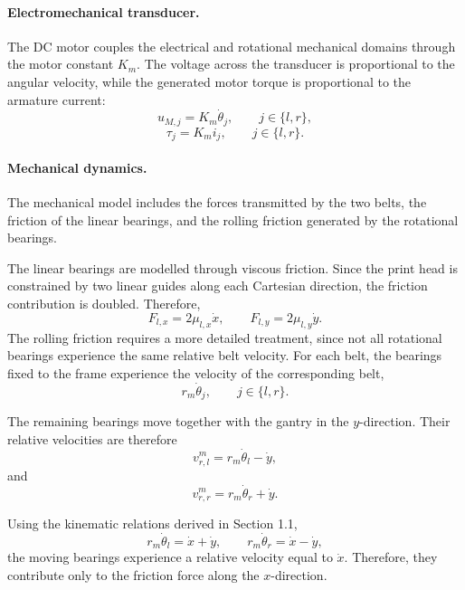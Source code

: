 \documentclass[11pt,a4paper]{article}
\begin{document}
\paragraph{Electromechanical transducer.}
The DC motor couples the electrical and rotational mechanical domains
through the motor constant $K_m$. The voltage across the transducer is
proportional to the angular velocity, while the generated motor torque is
proportional to the armature current:
\begin{equation}
u_{M,j}=K_m\dot{\theta}_j,
\qquad j\in\{l,r\},
\end{equation}
\begin{equation}
\tau_j=K_m i_j,
\qquad j\in\{l,r\}.
\end{equation}
\paragraph{Mechanical dynamics.}
The mechanical model includes the forces transmitted by the two belts,
the friction of the linear bearings, and the rolling friction generated
by the rotational bearings.

The linear bearings are modelled through viscous friction. Since the
print head is constrained by two linear guides along each Cartesian
direction, the friction contribution is doubled. Therefore,
\begin{equation}
F_{l,x}=2\mu_{l,x}\dot{x},
\qquad
F_{l,y}=2\mu_{l,y}\dot{y}.
\end{equation}
The rolling friction requires a more detailed treatment, since not all rotational bearings experience the same relative belt velocity. For each belt, the bearings fixed to the frame experience the velocity of the corresponding belt,
\[
r_m\dot{\theta}_j, \qquad j\in\{l,r\}.
\]

The remaining bearings move together with the gantry in the $y$-direction. Their relative velocities are therefore
\begin{equation}
v_{r,l}^{m}=r_m\dot{\theta}_l-\dot{y},
\end{equation}
and
\begin{equation}
v_{r,r}^{m}=r_m\dot{\theta}_r+\dot{y}.
\end{equation}

Using the kinematic relations derived in Section 1.1,
\[
r_m\dot{\theta}_l=\dot{x}+\dot{y},
\qquad
r_m\dot{\theta}_r=\dot{x}-\dot{y},
\]
the moving bearings experience a relative velocity equal to $\dot{x}$. Therefore, they contribute only to the friction force along the $x$-direction.
\end{document}
